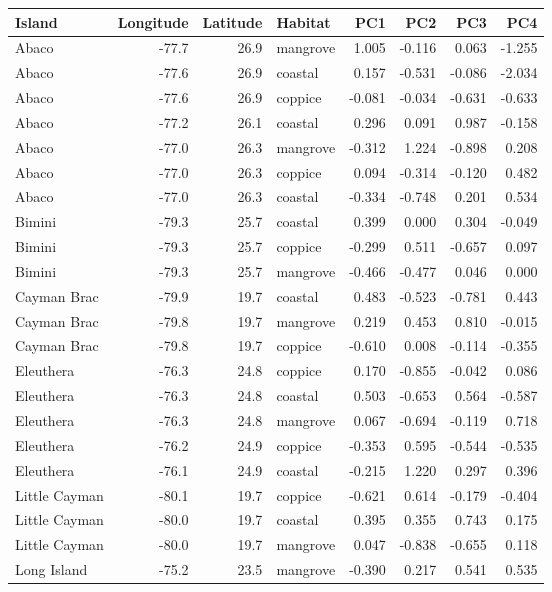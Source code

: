 
\begin{tabular}{lrrlrrrr}
\toprule
Island & Longitude & Latitude & Habitat & PC1 & PC2 & PC3 & PC4\\
\midrule
Abaco & -77.7 & 26.9 & mangrove & 1.005 & -0.116 & 0.063 & -1.255\\
Abaco & -77.6 & 26.9 & coastal & 0.157 & -0.531 & -0.086 & -2.034\\
Abaco & -77.6 & 26.9 & coppice & -0.081 & -0.034 & -0.631 & -0.633\\
Abaco & -77.2 & 26.1 & coastal & 0.296 & 0.091 & 0.987 & -0.158\\
Abaco & -77.0 & 26.3 & mangrove & -0.312 & 1.224 & -0.898 & 0.208\\
Abaco & -77.0 & 26.3 & coppice & 0.094 & -0.314 & -0.120 & 0.482\\
Abaco & -77.0 & 26.3 & coastal & -0.334 & -0.748 & 0.201 & 0.534\\
Bimini & -79.3 & 25.7 & coastal & 0.399 & 0.000 & 0.304 & -0.049\\
Bimini & -79.3 & 25.7 & coppice & -0.299 & 0.511 & -0.657 & 0.097\\
Bimini & -79.3 & 25.7 & mangrove & -0.466 & -0.477 & 0.046 & 0.000\\
Cayman Brac & -79.9 & 19.7 & coastal & 0.483 & -0.523 & -0.781 & 0.443\\
Cayman Brac & -79.8 & 19.7 & mangrove & 0.219 & 0.453 & 0.810 & -0.015\\
Cayman Brac & -79.8 & 19.7 & coppice & -0.610 & 0.008 & -0.114 & -0.355\\
Eleuthera & -76.3 & 24.8 & coppice & 0.170 & -0.855 & -0.042 & 0.086\\
Eleuthera & -76.3 & 24.8 & coastal & 0.503 & -0.653 & 0.564 & -0.587\\
Eleuthera & -76.3 & 24.8 & mangrove & 0.067 & -0.694 & -0.119 & 0.718\\
Eleuthera & -76.2 & 24.9 & coppice & -0.353 & 0.595 & -0.544 & -0.535\\
Eleuthera & -76.1 & 24.9 & coastal & -0.215 & 1.220 & 0.297 & 0.396\\
Little Cayman & -80.1 & 19.7 & coppice & -0.621 & 0.614 & -0.179 & -0.404\\
Little Cayman & -80.0 & 19.7 & coastal & 0.395 & 0.355 & 0.743 & 0.175\\
Little Cayman & -80.0 & 19.7 & mangrove & 0.047 & -0.838 & -0.655 & 0.118\\
Long Island & -75.2 & 23.5 & mangrove & -0.390 & 0.217 & 0.541 & 0.535\\

\end{tabular}
